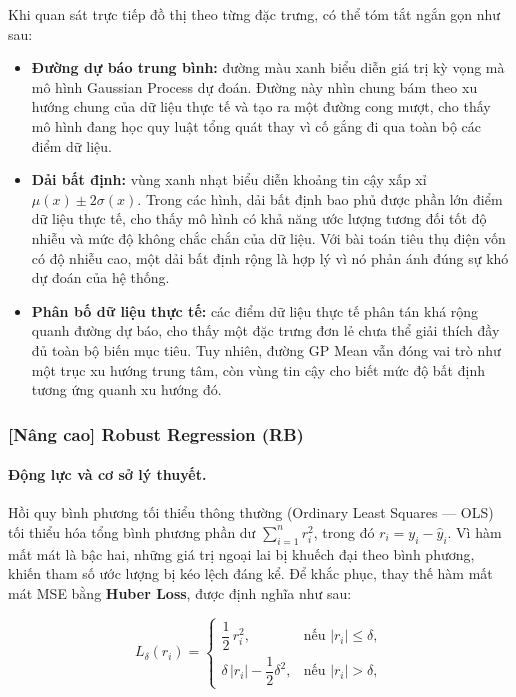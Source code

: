 Khi quan sát trực tiếp đồ thị theo từng đặc trưng, có thể tóm tắt ngắn gọn như sau:
\begin{itemize}[labelsep=10pt, leftmargin=1.8cm]
    \item \textbf{Đường dự báo trung bình:} đường màu xanh biểu diễn giá trị kỳ vọng mà mô hình Gaussian Process dự đoán. Đường này nhìn chung bám theo xu hướng chung của dữ liệu thực tế và tạo ra một đường cong mượt, cho thấy mô hình đang học quy luật tổng quát thay vì cố gắng đi qua toàn bộ các điểm dữ liệu.

    \item \textbf{Dải bất định:} vùng xanh nhạt biểu diễn khoảng tin cậy xấp xỉ $\mu(x) \pm 2\sigma(x)$. Trong các hình, dải bất định bao phủ được phần lớn điểm dữ liệu thực tế, cho thấy mô hình có khả năng ước lượng tương đối tốt độ nhiễu và mức độ không chắc chắn của dữ liệu. Với bài toán tiêu thụ điện vốn có độ nhiễu cao, một dải bất định rộng là hợp lý vì nó phản ánh đúng sự khó dự đoán của hệ thống.

    \item \textbf{Phân bố dữ liệu thực tế:} các điểm dữ liệu thực tế phân tán khá rộng quanh đường dự báo, cho thấy một đặc trưng đơn lẻ chưa thể giải thích đầy đủ toàn bộ biến mục tiêu. Tuy nhiên, đường GP Mean vẫn đóng vai trò như một trục xu hướng trung tâm, còn vùng tin cậy cho biết mức độ bất định tương ứng quanh xu hướng đó.
\end{itemize}

\subsubsection{[Nâng cao] Robust Regression (RB)}

\paragraph{Động lực và cơ sở lý thuyết.}
Hồi quy bình phương tối thiểu thông thường (Ordinary Least Squares — OLS) tối thiểu hóa tổng bình phương phần dư $\sum_{i=1}^{n} r_i^2$, trong đó $r_i = y_i - \hat{y}_i$. Vì hàm mất mát là bậc hai, những giá trị ngoại lai bị khuếch đại theo bình phương, khiến tham số ước lượng bị kéo lệch đáng kể. Để khắc phục, thay thế hàm mất mát MSE bằng \textbf{Huber Loss}, được định nghĩa như sau:

\begin{equation}
    L_\delta(r_i) =
    \begin{cases}
        \dfrac{1}{2}\,r_i^2, & \text{nếu } |r_i| \le \delta, \\[6pt]
        \delta\,|r_i| - \dfrac{1}{2}\delta^2, & \text{nếu } |r_i| > \delta,
    \end{cases}
    \label{eq:huber_loss}
\end{equation}

